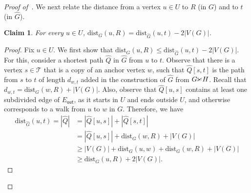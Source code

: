\documentclass[11pt,a4paper]{article}
\newtheorem{claim}{Claim}[section]
\newcommand{\dist}{\mathrm{dist}}
\renewcommand{\le}{\leqslant}
\renewcommand{\ge}{\geqslant}
\newcommand{\cutgraph}{\textrm{\CutLeft}}
\begin{document}
\begin{proof}[Proof of~]
  We next relate the distance from a vertex $u\in U$ to $R$ (in $G$) and to $t$ (in $\widehat{G}$).
  \begin{claim}\label{cl:dist}
    For every $u\in U$, $\dist_G(u,R)=\dist_{\widehat{G}}(u,t) - 2|V(G)|$.
  \end{claim}
  \begin{proof}
    Fix $u\in U$.
    We first show that $\dist_G(u,R)\le \dist_{\widehat{G}}(u,t) - 2|V(G)|$.
    For this, consider a shortest path $\widehat{Q}$ in $\widehat{G}$ from $u$ to $t$.
    Observe that there is a vertex $s\in\mathcal{T}$ that is a copy of an anchor vertex $w$,
    such that $\widehat{Q}[s,t]$ is the path from $s$ to $t$ of length $d_{w,t}$
    added in the construction of $\widehat{G}$ from $G\cutgraph H$. Recall that $d_{w,t} =\dist_G(w,R)+|V(G)|$.
    Also, observe that $\widehat{Q}[u,s]$ contains at least one subdivided edge of $E_{\mathsf{out}}$, as it starts
    in $U$ and ends outside $U$, and otherwise corresponds to a walk from $u$ to $w$ in $G$.
    Therefore, we have
    \begin{align*}
      \dist_{\widehat{G}}(u,t)  = |\widehat{Q}| & = |\widehat{Q}[u,s]|+|\widehat{Q}[s,t]|\\ 
        & = |\widehat{Q}[u,s]| + \dist_G(w,R)+|V(G)|\\
        & \ge |V(G)| + \dist_G(u, w) + \dist_G(w,R) + |V(G)|\\
        & \ge \dist_G(u,R) + 2|V(G)|.
    \end{align*}
    

\end{proof}
\end{proof}
\end{document}
